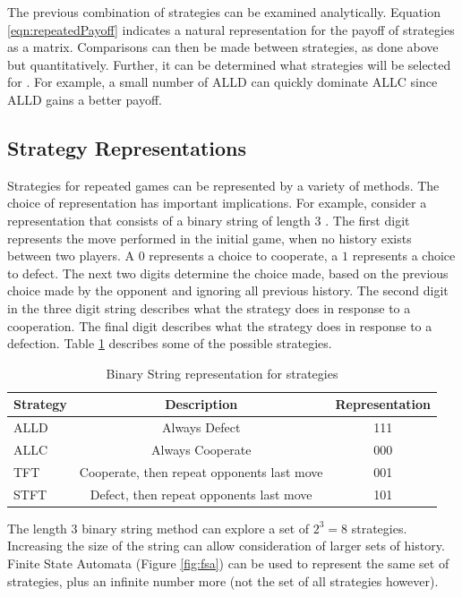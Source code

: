 \documentclass[a4paper,11pt]{article}
\begin{document}
The previous combination of strategies can be examined analytically. 
Equation \ref{eqn:repeatedPayoff} indicates a natural representation for the payoff of strategies as a matrix. 
Comparisons can then be made between strategies, as done above but quantitatively. 
Further, it can be determined what strategies will be selected for \citep{imhof:PNAS:2005}. 
For example, a small number of ALLD can quickly dominate ALLC since ALLD gains a better payoff. 
\subsection{Strategy Representations}
Strategies for repeated games can be represented by a variety of methods. The choice of representation has important implications. 
For example, consider a representation that consists of a binary string of length 3 \citep{garcia:PLoSOne:2012}. 
The first digit represents the move performed in the initial game, when no history exists between two players. 
A $0$ represents a choice to cooperate, a $1$ represents a choice to defect. 
The next two digits determine the choice made, based on the previous choice made by the opponent and ignoring all previous history. 
The second digit in the three digit string describes what the strategy does in response to a cooperation. 
The final digit describes what the strategy does in response to a defection. 
Table \ref{table:binaryStrategy} describes some of the possible strategies.

\begin{table}[h]
\centering
\captionsetup{justification=centering}
\begin{tabular}{|l|c|c|}
\hline
 Strategy & Description & Representation\\
\hline
ALLD & Always Defect & 111\\
\hline
ALLC & Always Cooperate & 000\\
\hline
TFT & Cooperate, then repeat opponents last move & 001\\
\hline
STFT & Defect, then repeat opponents last move & 101\\
\hline
\end{tabular}
\caption{Binary String representation for strategies}
\label{table:binaryStrategy}
\end{table}

The length 3 binary string method can explore a set of $2^3=8$ strategies. Increasing the size of the string can allow consideration of larger sets of history. 
Finite State Automata (Figure \ref{fig:fsa}) can be used to represent the same set of strategies, plus an infinite number more (not the set of all strategies however).
\end{document}
